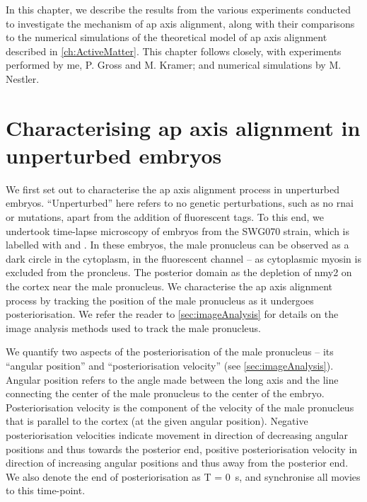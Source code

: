 In this chapter, we describe the results from the various experiments conducted to investigate the mechanism of \ac{ap} axis alignment, along with their comparisons to the numerical simulations of the theoretical model of \ac{ap} axis alignment described in \autoref{ch:ActiveMatter}. This chapter follows \citep{} closely, with experiments performed by me, P. Gross and M. Kramer; and numerical simulations by M. Nestler. 

\section{Characterising \acs{ap} axis alignment in unperturbed embryos} \label{sec:apAxisAlignCharacteriseWT}
We first set out to characterise the \ac{ap} axis alignment process in unperturbed embryos. \enquote{Unperturbed} here refers to no genetic perturbations, such as no \ac{rnai} or mutations, apart from the addition of fluorescent tags. To this end, we undertook time-lapse microscopy of embryos from the SWG070 strain, which is labelled with  and . In these embryos, the male pronucleus can be observed as a dark circle in the cytoplasm, in the  fluorescent channel -- as cytoplasmic myosin is excluded from the proncleus. The posterior domain as the depletion of \ac{nmy2} on the cortex near the male pronucleus. We characterise the \ac{ap} axis alignment process by tracking the position of the male pronucleus as it undergoes posteriorisation. We refer the reader to \autoref{sec:imageAnalysis} for details on the image analysis methods used to track the male pronucleus. 

We quantify two aspects of the posteriorisation of the male pronucleus -- its \enquote{angular position} and \enquote{posteriorisation velocity} (see \autoref{sec:imageAnalysis}). Angular position refers to the angle made between the long axis and the line connecting the center of the male pronucleus to the center of the embryo. Posteriorisation velocity is the component of the velocity of the male pronucleus that is parallel to the cortex (at the given angular position). Negative posteriorisation velocities indicate movement in direction of decreasing angular positions and thus towards the posterior end, positive posteriorisation velocity in direction of increasing angular positions and thus away from the posterior end. We also denote the end of posteriorisation as T = \SI{0}{\second}, and synchronise all movies to this time-point. 

